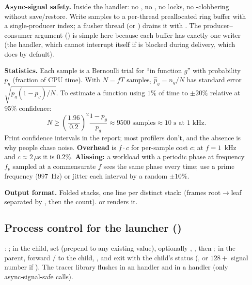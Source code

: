 \textbf{Async-signal safety.} Inside the handler: no , no , no locks, no -clobbering without save/restore. Write samples to a per-thread preallocated ring buffer with a single-producer index; a flusher thread (or ) drains it with . The producer--consumer argument () is simple here because each buffer has exactly one writer (the handler, which cannot interrupt itself if  is blocked during delivery, which  does by default).

\textbf{Statistics.} Each sample is a Bernoulli trial for ``in function $g$'' with probability $p_g$ (fraction of CPU time). With $N = fT$ samples, $\hat p_g = n_g/N$ has standard error $\sqrt{p_g(1-p_g)/N}$. To estimate a function using $1\%$ of time to $\pm 20\%$ relative at 95\% confidence:
\begin{equation}
N \ge \left(\frac{1.96}{0.2}\right)^2 \frac{1-p_g}{p_g} \approx 9500 \text{ samples} \approx 10\text{ s at } 1\text{ kHz}.
\end{equation}
Print confidence intervals in the report; most profilers don't, and the absence is why people chase noise. \textbf{Overhead} is $f\cdot c$ for per-sample cost $c$; at $f = 1$~kHz and $c \approx 2\,\mu$s it is $0.2\%$. \textbf{Aliasing:} a workload with a periodic phase at frequency $f_p$ sampled at a commensurate $f$ sees the same phase every time; use a prime frequency (997~Hz) or jitter each interval by a random $\pm 10\%$.

\textbf{Output format.} Folded stacks, one line per distinct stack:  (frames root$\to$leaf separated by \code{;}, then the count).  or  renders it.

\subsection{Process control for the launcher ()}

: ; in the child, set  (prepend to any existing value), optionally , , then ; in the parent, forward / to the child, , and exit with the child's status (, or $128 + $ signal number if ). The tracer library flushes in an  handler and in a  handler (only async-signal-safe calls).

